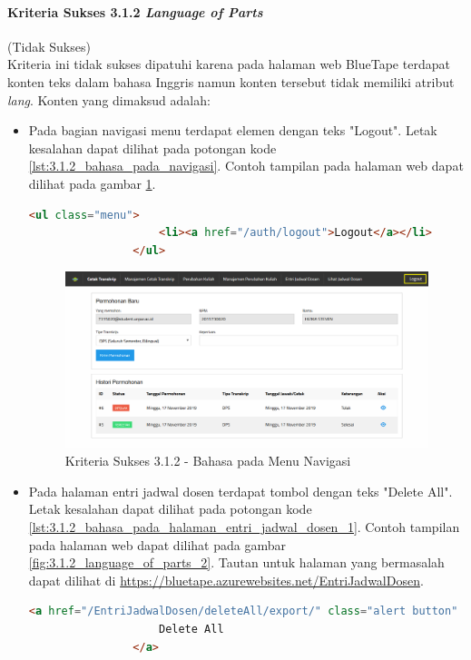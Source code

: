 \documentclass[a4paper,twoside]{article}
\begin{document}
\begin{enumerate}
		\paragraph{Kriteria Sukses 3.1.2 \textit{Language of Parts}}
		\label{par:kepatuhan_bluetape_kriteria_sukses_3.1.2}
		(Tidak Sukses)\\

		Kriteria ini tidak sukses dipatuhi karena pada halaman web BlueTape terdapat konten teks dalam bahasa Inggris namun konten tersebut tidak memiliki atribut \textit{lang}. Konten yang dimaksud adalah:

		\begin{itemize}
			\item Pada bagian navigasi menu terdapat elemen dengan teks "Logout". Letak kesalahan dapat dilihat pada potongan kode \ref{lst:3.1.2_bahasa_pada_navigasi}. Contoh tampilan pada halaman web dapat dilihat pada gambar \ref{fig:3.1.2_language_of_parts_1}. 
			\begin{lstlisting}[frame=single, label={lst:3.1.2_bahasa_pada_navigasi}, language=HTML, caption=Kriteria Sukses 3.1.2 - Bahasa yang Tidak Sesuai pada Menu Navigasi]
				<ul class="menu">
					<li><a href="/auth/logout">Logout</a></li>
				</ul>
			\end{lstlisting}
			
			\begin{figure}[H]
				\centering  
				\includegraphics[scale=0.3, frame]{kriteria-sukses-3-1-2-language-of-parts-1}  
				\caption[Kriteria Sukses 3.1.2 - Bahasa pada Menu Navigasi]{Kriteria Sukses 3.1.2 - Bahasa pada Menu Navigasi}
				\label{fig:3.1.2_language_of_parts_1}  
			\end{figure}

			\item Pada halaman entri jadwal dosen terdapat tombol dengan teks "Delete All". Letak kesalahan dapat dilihat pada potongan kode \ref{lst:3.1.2_bahasa_pada_halaman_entri_jadwal_dosen_1}. Contoh tampilan pada halaman web dapat dilihat pada gambar \ref{fig:3.1.2_language_of_parts_2}. Tautan untuk halaman yang bermasalah dapat dilihat di \url{https://bluetape.azurewebsites.net/EntriJadwalDosen}.
			\begin{lstlisting}[frame=single, label={lst:3.1.2_bahasa_pada_halaman_entri_jadwal_dosen_1}, language=HTML, caption=Kriteria Sukses 3.1.2 - Bahasa yang Tidak Sesuai pada Halaman Entri Jadwal Dosen 1]
				<a href="/EntriJadwalDosen/deleteAll/export/" class="alert button" onClick="return konfirmasi();">
					Delete All
				</a>
			\end{lstlisting}
			

\end{itemize}
\end{enumerate}
\end{document}
